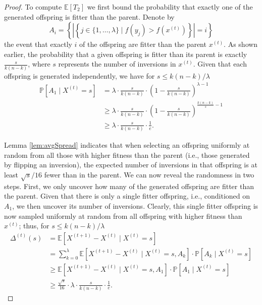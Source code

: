 \begin{proof}
    \vspace{4mm}
    To compute $\mathbb{E}[T_2]$ we first bound the probability that exactly one of the generated offspring is fitter than the parent. Denote by 
    \begin{displaymath}
    A_i = \left\{ \left| \left\{ j \in \{1, \dots, \lambda\} \mid f(y_j) > f(x^{(t)}) \right\} \right| = i \right\}
    \end{displaymath}
    the event that exactly $i$ of the offspring are fitter than the parent $x^{(t)}$. As shown earlier, the probability that a given offspring is fitter than its parent is exactly $\frac{s}{k(n-k)}$, where $s$ represents the number of inversions in $x^{(t)}$. Given that each offspring is generated independently, we have for $s \le k(n-k)/\lambda$
    \begin{align*}
    \mathbb{P}[A_1 \mid X^{(t)} = s] &= \lambda \cdot \frac{s}{k(n-k)} \cdot \left(1 - \frac{s}{k(n-k)}\right)^{\lambda-1} \\
    &\geq \lambda \cdot \frac{s}{k(n-k)} \cdot \left(1 - \frac{s}{k(n-k)}\right)^{\frac{k(n-k)}{s}-1} \\
    &\geq \lambda \cdot \frac{s}{k(n-k)} \cdot \frac{1}{e}.
\end{align*}

    Lemma \ref{lem:avgSpread} indicates that when selecting an offspring uniformly at random from all those with higher fitness than the parent (i.e., those generated by flipping an inversion), the expected number of inversions in that offspring is at least $\sqrt{s}/16$ fewer than in the parent. We can now reveal the randomness in two steps. First, we only uncover how many of the generated offspring are fitter than the parent. Given that there is only a single fitter offspring, i.e., conditioned on $A_1$, we then uncover its number of inversions. Clearly, this single fitter offspring is now sampled uniformly at random from all offspring with higher fitness than $x^{(t)}$; thus, for $s \le k(n-k)/\lambda$
    \vspace{1mm}
    \begin{align*}
    \Delta^{(t)}(s) &= \mathbb{E}[X^{(t+1)} - X^{(t)} \mid X^{(t)} = s] \\
    &= \sum_{k=0}^{\lambda} \mathbb{E}[X^{(t+1)} - X^{(t)} \mid X^{(t)} = s, A_k] \cdot \mathbb{P}[A_k \mid X^{(t)} = s] \\ 
    &\geq \mathbb{E}[X^{(t+1)} - X^{(t)} \mid X^{(t)} = s, A_1] \cdot \mathbb{P}[A_1 \mid X^{(t)} = s] \\
    &\geq \frac{\sqrt{s}}{16} \cdot \lambda \cdot \frac{s}{k(n-k)} \cdot \frac{1}{e}.
    \end{align*}


\end{proof}
